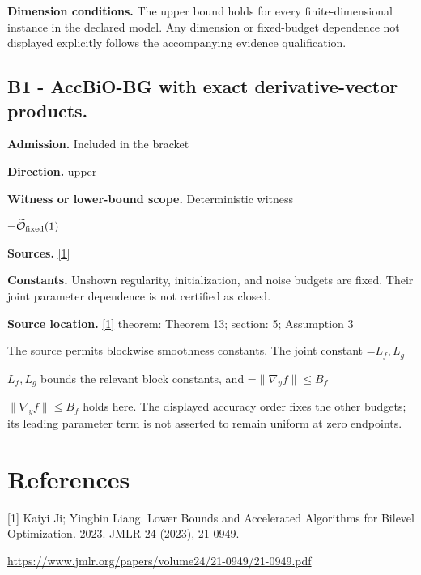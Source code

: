 \documentclass[10pt,a4paper]{article}
\newcommand{\AtlasMath}[1]{\par\begingroup\centering\setbox0=\hbox{$\displaystyle #1$}\ifdim\wd0>1.4\linewidth\typeout{ATLAS WIDE FORMULA: \the\wd0}\fi\ifdim\wd0>\linewidth\resizebox{\linewidth}{!}{\box0}\else\box0\fi\par\endgroup}
\newcommand{\AtlasInlineMath}[1]{\begingroup\setbox0=\hbox{$#1$}\ifdim\wd0>.4\linewidth\endgroup\AtlasMath{#1}\else\endgroup$#1$\fi}
\begin{document}
\textbf{Dimension conditions.} The upper bound holds for every finite-dimensional instance in the declared model. Any dimension or fixed-budget dependence not displayed explicitly follows the accompanying evidence qualification.

\subsection{B1 - AccBiO-BG with exact derivative-vector products.}
\textbf{Admission.} Included in the bracket

\textbf{Direction.} upper

\textbf{Witness or lower-bound scope.} Deterministic witness

\AtlasMath{\widetilde{\mathcal{O}}_{\rm fixed}(1)}
\textbf{Sources.} \href{https://www.jmlr.org/papers/volume24/21-0949/21-0949.pdf}{[1]}

\textbf{Constants.} Unshown regularity, initialization, and noise budgets are fixed. Their joint parameter dependence is not certified as closed.

\textbf{Source location.} \href{https://www.jmlr.org/papers/volume24/21-0949/21-0949.pdf}{[1]} theorem: Theorem 13; section: 5; Assumption 3

The source permits blockwise smoothness constants. The joint constant \AtlasInlineMath{L_f,L_g} bounds the relevant block constants, and \AtlasInlineMath{\|\nabla_yf\|\le B_f} holds here. The displayed accuracy order fixes the other budgets; its leading parameter term is not asserted to remain uniform at zero endpoints.

\section{References}
[1] Kaiyi Ji; Yingbin Liang. Lower Bounds and Accelerated Algorithms for Bilevel Optimization. 2023. JMLR 24 (2023), 21-0949.

\url{https://www.jmlr.org/papers/volume24/21-0949/21-0949.pdf}
\end{document}
